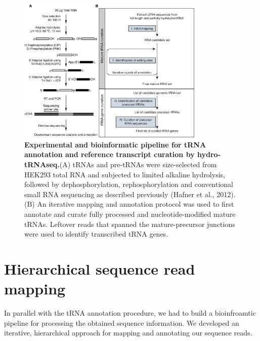 \documentclass[12pt]{rockefeller}
\begin{document}
\begin{figure}[!ht]%
\centering
\includegraphics[width=3.5in]{paper1.png}%
\caption[Experimental and bioinformatic pipeline for tRNA annotation and reference transcript curation by hydro-tRNAseq]{\textbf{Experimental and bioinformatic pipeline for tRNA annotation and reference transcript curation by hydro-tRNAseq.}(A) tRNAs and pre-tRNAs were size-selected from HEK293 total RNA and subjected to limited alkaline hydrolysis, followed by dephosphorylation, rephosphorylation and conventional small RNA sequencing as described previously (Hafner et al., 2012). (B) An iterative mapping and annotation protocol was used to first annotate and curate fully processed and nucleotide-modified mature tRNAs. Leftover reads that spanned the mature-precursor junctions were used to identify transcribed tRNA genes.}
\centering
\label{paper1}%
\end{figure}

\section{Hierarchical sequence read mapping}
In parallel with the tRNA annotation procedure, we had to build a bioinfroamtic pipeline for processing the obtained sequence information.
We developed an iterative, hierarchical approach for mapping and annotating our sequence reads. 
\end{document}
